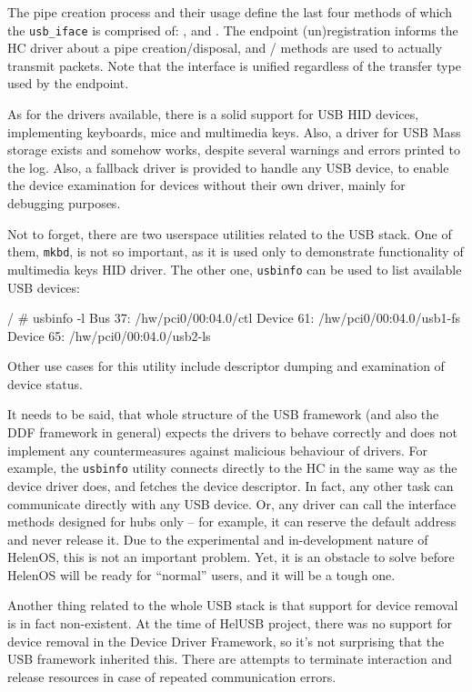 The pipe creation process and their usage define the last four methods of which
the \texttt{usb\_iface} is comprised of: , 
and . The endpoint (un)registration informs the HC driver about
a pipe creation/disposal, and / methods are used to
actually transmit packets. Note that the interface is unified regardless of the
transfer type used by the endpoint.

As for the drivers available, there is a solid support for USB HID devices,
implementing keyboards, mice and multimedia keys. Also, a driver for USB Mass
storage exists and somehow works, despite several warnings and errors printed
to the log. Also, a fallback driver is provided to handle any USB device, to
enable the device examination for devices without their own driver, mainly for
debugging purposes.

Not to forget, there are two userspace utilities related to the USB stack. One
of them, \texttt{mkbd}, is not so important, as it is used only to demonstrate
functionality of multimedia keys HID driver. The other one, \texttt{usbinfo}
can be used to list available USB devices:

\begin{bdsh}
/ # usbinfo -l
Bus 37: /hw/pci0/00:04.0/ctl
	Device 61: /hw/pci0/00:04.0/usb1-fs
	Device 65: /hw/pci0/00:04.0/usb2-ls
\end{bdsh}

Other use cases for this utility include descriptor dumping and examination of
device status.

It needs to be said, that whole structure of the USB framework (and also the
DDF framework in general) expects the drivers to behave correctly and does not
implement any countermeasures against malicious behaviour of drivers. For
example, the \texttt{usbinfo} utility connects directly to the HC in the same
way as the device driver does, and fetches the device descriptor. In fact, any
other task can communicate directly with any USB device. Or, any driver can
call the interface methods designed for hubs only -- for example, it can
reserve the default address and never release it. Due to the experimental and
in-development nature of HelenOS, this is not an important problem. Yet, it is
an obstacle to solve before HelenOS will be ready for ``normal'' users, and it
will be a tough one.

Another thing related to the whole USB stack is that support for device
removal is in fact non-existent. At the time of HelUSB project, there was no
support for device removal in the Device Driver Framework, so it's not
surprising that the USB framework inherited this. There are attempts to
terminate interaction and release resources in case of repeated communication
errors.
